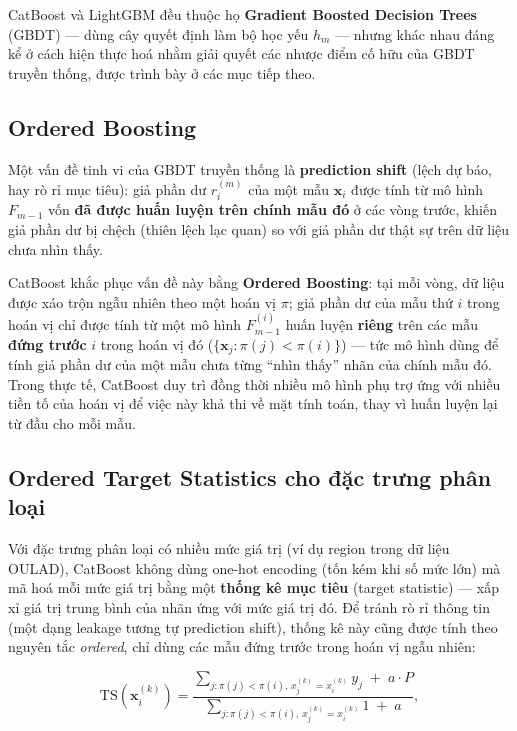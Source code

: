 \documentclass[a4paper]{article}
\newcommand{\code}[1]{{\ttfamily\def\_{\textunderscore\discretionary{}{}{}}#1}}
\def\code#1{#1}%
\def\_{ }%
\begin{document}
CatBoost và LightGBM đều thuộc họ \textbf{Gradient Boosted Decision Trees}
(GBDT) --- dùng cây quyết định làm bộ học yếu $h_m$ --- nhưng khác nhau đáng
kể ở cách hiện thực hoá nhằm giải quyết các nhược điểm cố hữu của GBDT
truyền thống, được trình bày ở các mục tiếp theo.

\subsection{Ordered Boosting}

Một vấn đề tinh vi của GBDT truyền thống là \textbf{prediction shift}
(lệch dự báo, hay rò rỉ mục tiêu): giả phần dư $r_i^{(m)}$ của một mẫu
$\mathbf{x}_i$ được tính từ mô hình $F_{m-1}$ vốn \textbf{đã được huấn luyện
trên chính mẫu đó} ở các vòng trước, khiến giả phần dư bị chệch (thiên lệch
lạc quan) so với giả phần dư thật sự trên dữ liệu chưa nhìn thấy.

CatBoost khắc phục vấn đề này bằng \textbf{Ordered Boosting}: tại mỗi vòng, dữ
liệu được xáo trộn ngẫu nhiên theo một hoán vị $\pi$; giả phần dư của mẫu thứ
$i$ trong hoán vị chỉ được tính từ một mô hình $F_{m-1}^{(i)}$ huấn luyện
\textbf{riêng} trên các mẫu \textbf{đứng trước} $i$ trong hoán vị đó
($\{\mathbf{x}_j : \pi(j) < \pi(i)\}$) --- tức mô hình dùng để tính giả phần dư
của một mẫu chưa từng ``nhìn thấy'' nhãn của chính mẫu đó. Trong thực tế,
CatBoost duy trì đồng thời nhiều mô hình phụ trợ ứng với nhiều tiền tố của
hoán vị để việc này khả thi về mặt tính toán, thay vì huấn luyện lại từ đầu
cho mỗi mẫu.

\subsection{Ordered Target Statistics cho đặc trưng phân loại}

Với đặc trưng phân loại có nhiều mức giá trị (ví dụ \code{region} trong dữ
liệu OULAD), CatBoost không dùng one-hot encoding (tốn kém khi số mức lớn) mà
mã hoá mỗi mức giá trị bằng một \textbf{thống kê mục tiêu} (target statistic)
--- xấp xỉ giá trị trung bình của nhãn ứng với mức giá trị đó. Để tránh rò rỉ
thông tin (một dạng leakage tương tự prediction shift), thống kê này cũng được
tính theo nguyên tắc \textit{ordered}, chỉ dùng các mẫu đứng trước trong hoán
vị ngẫu nhiên:

\[
  \text{TS}(\mathbf{x}_i^{(k)}) = \frac{\displaystyle\sum_{j : \pi(j) < \pi(i),\, x_j^{(k)} = x_i^{(k)}} y_j \; + \; a \cdot P}
  {\displaystyle\sum_{j : \pi(j) < \pi(i),\, x_j^{(k)} = x_i^{(k)}} 1 \; + \; a},
\]
\end{document}
